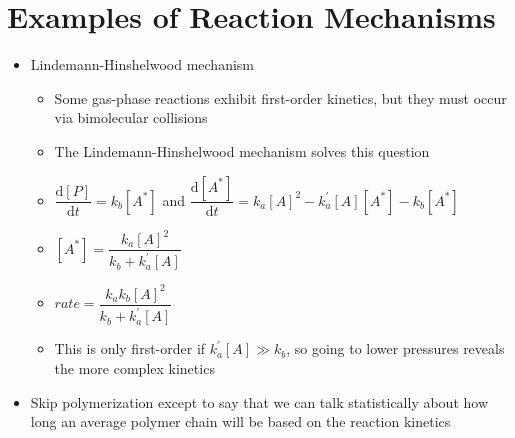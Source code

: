 \documentclass[12pt, openany, letterpaper]{memoir}
\begin{document}
\section{Examples of Reaction Mechanisms}
\begin{itemize}
	\item Lindemann-Hinshelwood mechanism
	      \begin{itemize}
		      \item Some gas-phase reactions exhibit first-order kinetics, but they must occur via bimolecular collisions
		      \item The Lindemann-Hinshelwood mechanism solves this question



		      \item $\dfrac{\mathrm{d}[P]}{\mathrm{d}t} = k_b[A^*]$ and  $\dfrac{\mathrm{d}[A^*]}{\mathrm{d}t} = k_a[A]^2-k^\prime_a[A][A^*]-k_b[A^*]$
		      \item $[A^*]=\dfrac{k_a[A]^2}{k_b+k^\prime_a[A]}$
		      \item $rate = \dfrac{k_ak_b[A]^2}{k_b+k^\prime_a[A]}$
		      \item This is only first-order if $k_a^\prime[A]\gg k_b$, so going to lower pressures reveals the more complex kinetics
	      \end{itemize}
	\item Skip polymerization except to say that we can talk statistically about how long an average polymer chain will be based on the reaction kinetics
\end{itemize}
\end{document}
